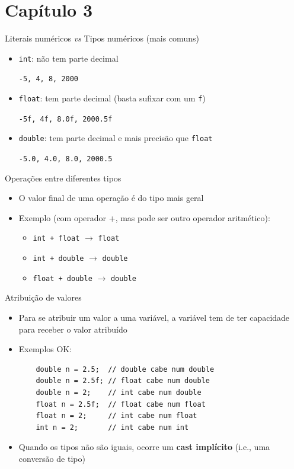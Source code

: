 \documentclass[portuguese, aspectratio=169, xcolor=table]{beamer}
\begin{document}
\section{Capítulo 3}
\begin{frame}{Literais numéricos \textit{vs} Tipos numéricos (mais comuns)}
\begin{itemize}
    \item \texttt{int}: não tem parte decimal

    \hspace{0.25cm}
    \texttt{-5, 4, 8, 2000}
    \item \texttt{float}: tem parte decimal (basta sufixar com um \texttt{f})

    \hspace{0.25cm}
    \texttt{-5f, 4f, 8.0f, 2000.5f}
    \item \texttt{double}: tem parte decimal e mais precisão que \texttt{float}

    \hspace{0.25cm}
    \texttt{-5.0, 4.0, 8.0, 2000.5}
\end{itemize}
\end{frame}

\begin{frame}{Operações entre diferentes tipos}
\begin{itemize}
    \item O valor final de uma operação é do tipo mais geral
    \item Exemplo (com operador +, mas pode ser outro operador aritmético):
    \begin{itemize}
        \item \texttt{int + float} $\rightarrow$ \texttt{float}
        \item \texttt{int + double} $\rightarrow$ \texttt{double}
        \item \texttt{float + double} $\rightarrow$ \texttt{double}
    \end{itemize}
\end{itemize}
\end{frame}

\begin{frame}[fragile]{Atribuição de valores}
\begin{itemize}
\item Para se atribuir um valor a uma variável, a variável tem de ter capacidade para receber o valor atribuído
\item Exemplos OK:
\begin{verbatim}
    double n = 2.5;  // double cabe num double
    double n = 2.5f; // float cabe num double
    double n = 2;    // int cabe num double
    float n = 2.5f;  // float cabe num float
    float n = 2;     // int cabe num float
    int n = 2;       // int cabe num int
\end{verbatim}
\item Quando os tipos não são iguais, ocorre um \textbf{cast implícito} (i.e., uma conversão de tipo)
\end{itemize}
\end{frame}
\end{document}
